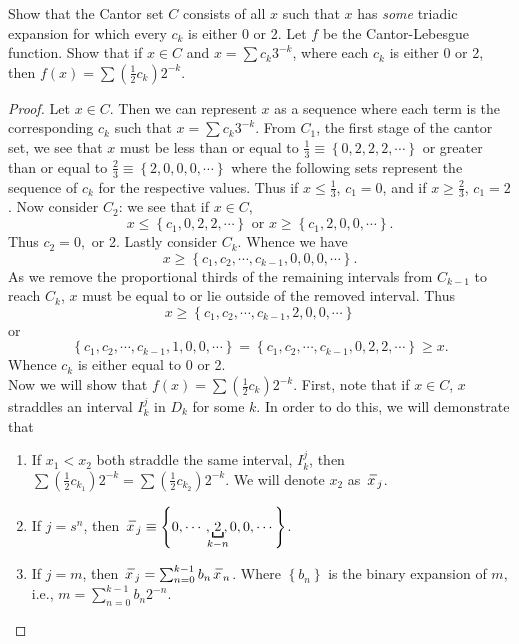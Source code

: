 \documentclass[12pt]{book}
\newcommand{\set}[1]{\left\{ #1 \right\}}
\newcommand{\tor}{\text{ or }}
\renewcommand{\.}{\mkern1mu}
\newcommand{\lr}[1]{\left(#1\right)}
\theoremstyle{theorem}
\renewcommand{\bar}[1]{\overset{\hspace{3pt}\rule[0.5pt]{\widthof{#1}}  
	{0.1ex}}{#1}}
\begin{document}
\item Show that the Cantor set $C$ consists of all $x$ such that $x$ has \textit{some} triadic expansion for which every $c_k$ is either 0 or 2.
	\subitem Let $f$ be the Cantor-Lebesgue function. Show that if $x\in C$ and $x = \sum c_k3^{-k}$, where each $c_k$ is either 0 or 2, then $f(x) = \sum \lr{\frac{1}{2} c_k}2^{-k}.$
		\begin{proof}
		Let $x\in C$. Then we can represent $x$ as a sequence where each term is the corresponding $c_k$ such that $x = \sum c_k3^{-k}$. From $C_1$, the first stage of the cantor set, we see that $x$ must be less than  or equal to $\frac{1}{3} \equiv \set{0,2,2,2,\cdots}$ or greater than or equal to $\frac{2}{3} \equiv \set{2,0,0,0, \cdots}$ where the following sets represent the sequence of $c_k$ for the respective values. Thus if $x \leq \frac{1}{3}$, $c_1= 0$, and if $x \geq \frac{2}{3}$, $c_1 = 2$. Now consider $C_2$: we see that if $x \in C$, 
		\[ x \leqslant \set{c_1, 0, 2, 2, \cdots } \tor x \geqslant \set{c_1, 2, 0, 0, \cdots}. \]
		Thus $c_2 = 0,$ or 2.
		Lastly consider $C_k$. Whence we have 
			\[ x \geqslant \set{c_1, c_2, \cdots, c_{k-1}, 0, 0, 0, \cdots}.\]
		As we remove the proportional thirds of the remaining intervals from $C_{k-1}$ to reach $C_k$, $x$ must be equal to or lie outside of the removed interval. Thus 
			\[ x \geqslant \set{c_1, c_2, \cdots, c_{k-1},2,0,0,\cdots}\] or
			\[ \set{c_1,c_2,\cdots,c_{k-1},1,0,0,\cdots} = \set{c_1,c_2,\cdots,c_{k-1},0,2,2,\cdots} \geqslant x.\]
		Whence $c_k$ is either equal to 0 or 2.\\
		
		Now we will show that $f(x) = \sum\lr{\frac{1}{2}c_k}2^{-k}.$ First, note that if $x\in C$, $x$ straddles an interval $I_k^j$ in $D_k$ for some $k$. In order to do this, we will demonstrate that 
			\begin{enumerate}[label = (\roman*)]
			\item If $x_1 < x_2$ both straddle the same interval, $I_k^j$, then $\sum \lr{\frac{1}{2}c_{k_1}}2^{-k} = \sum \lr{\frac{1}{2}c_{k_2}}2^{-k}.$ We will denote $x_2$ as $\bar{x}_j$.
			\item If $j = s^n$, then $\bar{x}_j \equiv \set{0, \cdots , \underbracket[1pt]{\,2\,}_{\mathclap {k-n}}, 0,0, \cdots}$. 
			\item If $j = m$, then $\bar{x}_j = \sum_{n=0}^{k-1}b_n\bar{x}_n$. Where $\set{b_n}$ is the binary expansion of $m$, i.e., $m = \sum_{n=0}^{k-1}b_n2^{-n}.$
			\end{enumerate}
			

\end{proof}
\end{document}
